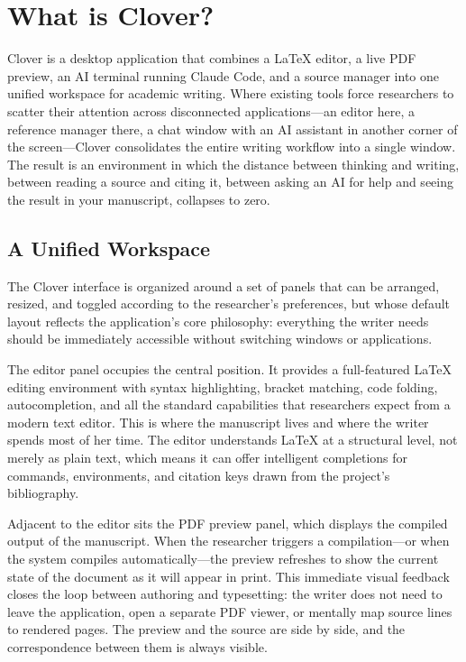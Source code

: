 \documentclass[a4paper,11pt]{article}
\begin{document}
\newpage

\section{What is Clover?}
\label{sec:overview}

Clover is a desktop application that combines a \LaTeX{} editor, a live PDF preview, an AI terminal running Claude Code, and a source manager into one unified workspace for academic writing. Where existing tools force researchers to scatter their attention across disconnected applications---an editor here, a reference manager there, a chat window with an AI assistant in another corner of the screen---Clover consolidates the entire writing workflow into a single window. The result is an environment in which the distance between thinking and writing, between reading a source and citing it, between asking an AI for help and seeing the result in your manuscript, collapses to zero.

\subsection{A Unified Workspace}

The Clover interface is organized around a set of panels that can be arranged, resized, and toggled according to the researcher's preferences, but whose default layout reflects the application's core philosophy: everything the writer needs should be immediately accessible without switching windows or applications.

The editor panel occupies the central position. It provides a full-featured \LaTeX{} editing environment with syntax highlighting, bracket matching, code folding, autocompletion, and all the standard capabilities that researchers expect from a modern text editor. This is where the manuscript lives and where the writer spends most of her time. The editor understands \LaTeX{} at a structural level, not merely as plain text, which means it can offer intelligent completions for commands, environments, and citation keys drawn from the project's bibliography.

Adjacent to the editor sits the PDF preview panel, which displays the compiled output of the manuscript. When the researcher triggers a compilation---or when the system compiles automatically---the preview refreshes to show the current state of the document as it will appear in print. This immediate visual feedback closes the loop between authoring and typesetting: the writer does not need to leave the application, open a separate PDF viewer, or mentally map source lines to rendered pages. The preview and the source are side by side, and the correspondence between them is always visible.
\end{document}
